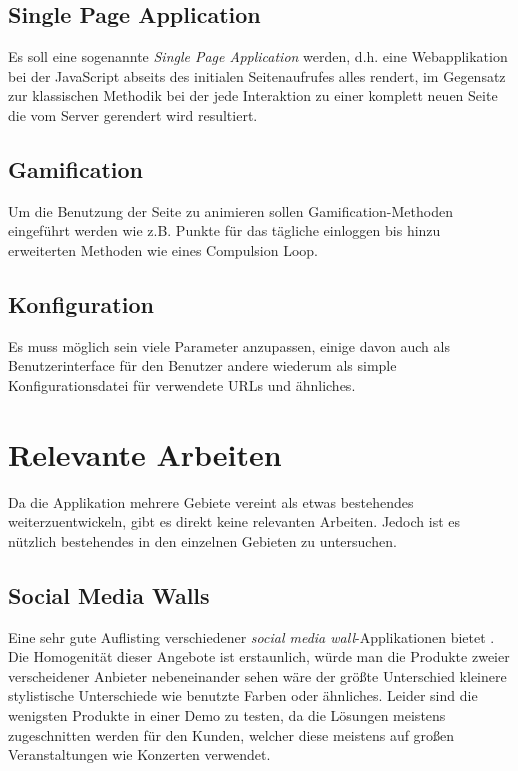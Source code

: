 \documentclass[12pt,twoside]{book}
\begin{document}
\subsection*{Single Page Application}
  Es soll eine sogenannte \textit{Single Page Application} werden, d.h. eine Webapplikation bei der JavaScript abseits des initialen Seitenaufrufes alles rendert, im Gegensatz zur klassischen Methodik bei der jede Interaktion zu einer komplett neuen Seite die vom Server gerendert wird resultiert.

\subsection*{Gamification}
  Um die Benutzung der Seite zu animieren sollen Gamification-Methoden eingeführt werden wie z.B. Punkte für das tägliche einloggen bis hinzu erweiterten Methoden wie eines Compulsion Loop.

\subsection*{Konfiguration}
  Es muss möglich sein viele Parameter anzupassen, einige davon auch als Benutzerinterface für den Benutzer andere wiederum als simple Konfigurationsdatei für verwendete URLs und ähnliches.

\section*{Relevante Arbeiten}

Da die Applikation mehrere Gebiete vereint als etwas bestehendes weiterzuentwickeln, gibt es direkt keine relevanten Arbeiten. Jedoch ist es nützlich bestehendes in den einzelnen Gebieten zu untersuchen.

\subsection*{Social Media Walls}

Eine sehr gute Auflisting verschiedener \textit{social media wall}-Applikationen bietet \citep{hofram}. Die Homogenität dieser Angebote ist erstaunlich, würde man die Produkte zweier verscheidener Anbieter nebeneinander sehen wäre der größte Unterschied kleinere stylistische Unterschiede wie benutzte Farben oder ähnliches. Leider sind die wenigsten Produkte in einer Demo zu testen, da die Lösungen meistens zugeschnitten werden für den Kunden, welcher diese meistens auf großen Veranstaltungen wie Konzerten verwendet. \\
\end{document}
